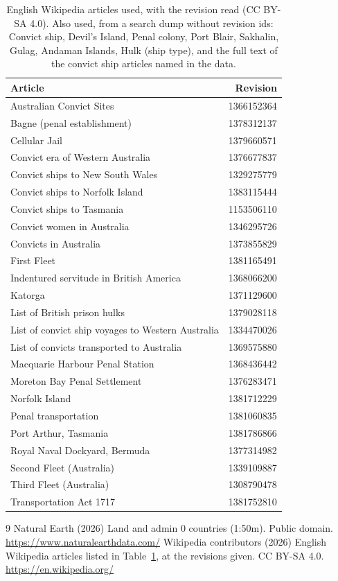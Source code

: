 \documentclass[11pt,a4paper]{article}
\begin{document}
\begin{table}[tbp]\centering\small\caption{English Wikipedia articles used, with the revision read (CC BY-SA 4.0). Also used, from a search dump without revision ids: Convict ship, Devil's Island, Penal colony, Port Blair, Sakhalin, Gulag, Andaman Islands, Hulk (ship type), and the full text of the convict ship articles named in the data.}\label{tab:revs}\begin{tabular}{lr}\toprule Article & Revision\\\midrule
Australian Convict Sites & 1366152364\\
Bagne (penal establishment) & 1378312137\\
Cellular Jail & 1379660571\\
Convict era of Western Australia & 1376677837\\
Convict ships to New South Wales & 1329275779\\
Convict ships to Norfolk Island & 1383115444\\
Convict ships to Tasmania & 1153506110\\
Convict women in Australia & 1346295726\\
Convicts in Australia & 1373855829\\
First Fleet & 1381165491\\
Indentured servitude in British America & 1368066200\\
Katorga & 1371129600\\
List of British prison hulks & 1379028118\\
List of convict ship voyages to Western Australia & 1334470026\\
List of convicts transported to Australia & 1369575880\\
Macquarie Harbour Penal Station & 1368436442\\
Moreton Bay Penal Settlement & 1376283471\\
Norfolk Island & 1381712229\\
Penal transportation & 1381060835\\
Port Arthur, Tasmania & 1381786866\\
Royal Naval Dockyard, Bermuda & 1377314982\\
Second Fleet (Australia) & 1339109887\\
Third Fleet (Australia) & 1308790478\\
Transportation Act 1717 & 1381752810\\
\bottomrule\end{tabular}\end{table}

\begin{thebibliography}{9}
 Natural Earth (2026) Land and admin 0 countries (1:50m). Public domain. \url{https://www.naturalearthdata.com/}
 Wikipedia contributors (2026) English Wikipedia articles listed in Table~\ref{tab:revs}, at the revisions given. CC BY-SA 4.0. \url{https://en.wikipedia.org/}
\end{thebibliography}
\end{document}
